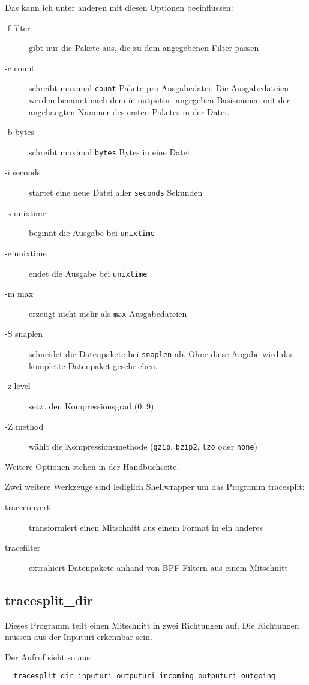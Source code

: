 \begin{normaltext}
  Das kann ich unter anderen mit diesen Optionen beeinflussen:
  \begin{description}
    \item[-f filter] gibt nur die Pakete aus, die zu dem angegebenen Filter
      passen
    \item[-c count] schreibt maximal \verb?count? Pakete pro Ausgabedatei. Die
      Ausgabedateien werden benannt nach dem in outputuri angegeben Basisnamen
      mit der angehängten Nummer des ersten Paketes in der Datei.
    \item[-b bytes] schreibt maximal \verb?bytes? Bytes in eine Datei
    \item[-i seconds] startet eine neue Datei aller \verb?seconds? Sekunden
    \item[-s unixtime] beginnt die Ausgabe bei \verb?unixtime?
    \item[-e unixtime] endet die Ausgabe bei \verb?unixtime?
    \item[-m max] erzeugt nicht mehr als \verb?max? Ausgabedateien
    \item[-S snaplen] schneidet die Datenpakete bei \verb?snaplen? ab. Ohne
      diese Angabe wird das komplette Datenpaket geschrieben.
    \item[-z level] setzt den Kompressionsgrad (0..9)
    \item[-Z method] wählt die Kompressionsmethode (\verb?gzip?, \verb?bzip2?,
      \verb?lzo? oder \verb?none?)
  \end{description}
  Weitere Optionen stehen in der Handbuchseite.

  Zwei weitere Werkzeuge sind lediglich Shellwrapper um das Programm
  tracesplit:
  \begin{description}
    \item[traceconvert] transformiert einen Mitschnitt aus einem Format in
      ein anderes
    \item[tracefilter] extrahiert Datenpakete anhand von BPF-Filtern aus einem
      Mitschnitt
  \end{description}

  \subsection*{tracesplit\_dir}
  Dieses Programm teilt einen Mitschnitt in zwei Richtungen auf. Die
  Richtungen müssen aus der Inputuri erkennbar sein.

  Der Aufruf sieht so aus:
  \begin{verbatim}
  tracesplit_dir inputuri outputuri_incoming outputuri_outgoing
  \end{verbatim}


\end{normaltext}

